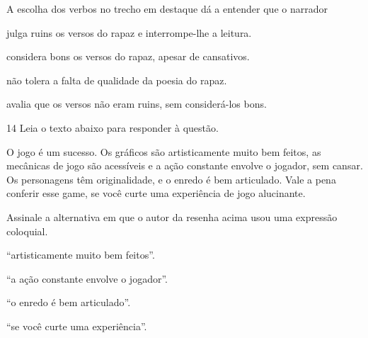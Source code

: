 A escolha dos verbos no trecho em destaque dá a entender que o narrador

\begin{escolha}

  \item julga ruins os versos do rapaz e interrompe-lhe a leitura.

  \item considera bons os versos do rapaz, apesar de cansativos.

  \item não tolera a falta de qualidade da poesia do rapaz.

  \item avalia que os versos não eram ruins, sem considerá-los bons.

\end{escolha}

\num{14} Leia o texto abaixo para responder à questão. 

\begin{myquote}




O jogo é um sucesso. Os gráficos são artisticamente muito bem feitos, as
mecânicas de jogo são acessíveis e a ação constante envolve o jogador, sem
cansar. Os personagens têm originalidade, e o enredo é bem articulado. Vale 
a pena conferir esse game, se você curte uma experiência de jogo alucinante.


\end{myquote}

Assinale a alternativa em que o autor da resenha acima usou uma expressão 
coloquial.

\begin{escolha}
  
  \item ``artisticamente muito bem feitos''.
  
  \item ``a ação constante envolve o jogador''.
  
  \item ``o enredo é bem articulado''.
  
  \item ``se você curte uma experiência''.

\end{escolha}

